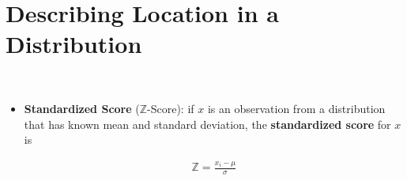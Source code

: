 \documentclass[Main.tex]{subfiles}
\begin{document}
	\section{Describing Location in a Distribution}
	
	\begin{example} \hfill \\
		\begin{itemize}		
			\item \textbf{Standardized Score} ($\mathbb{Z}$-Score): if $x$ is an observation from a distribution that has known mean and standard deviation, the \textbf{standardized score} for $x$ is 
			
			\begin{definition}				
				\begin{subequations}
					\begin{align}
						\mathbb{Z}=\frac{x_{i}-\mu}{\sigma}
					\end{align}
				\end{subequations}
			\end{definition}\hfill 
		\end{itemize}	
	\end{example}
	
\end{document}
